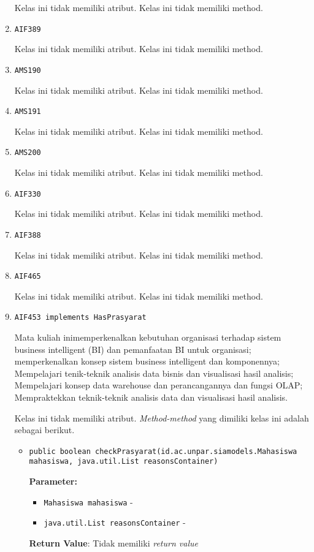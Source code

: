 \documentclass{article}
\begin{document}
\begin{enumerate}
Kelas ini tidak memiliki atribut. Kelas ini tidak memiliki method. \item \texttt{AIF389}



Kelas ini tidak memiliki atribut. Kelas ini tidak memiliki method. \item \texttt{AMS190}



Kelas ini tidak memiliki atribut. Kelas ini tidak memiliki method. \item \texttt{AMS191}



Kelas ini tidak memiliki atribut. Kelas ini tidak memiliki method. \item \texttt{AMS200}



Kelas ini tidak memiliki atribut. Kelas ini tidak memiliki method. \item \texttt{AIF330}



Kelas ini tidak memiliki atribut. Kelas ini tidak memiliki method. \item \texttt{AIF388}



Kelas ini tidak memiliki atribut. Kelas ini tidak memiliki method. \item \texttt{AIF465}



Kelas ini tidak memiliki atribut. Kelas ini tidak memiliki method. \item \texttt{AIF453 implements HasPrasyarat}

Mata kuliah inimemperkenalkan kebutuhan organisasi terhadap sistem business
 intelligent (BI) dan pemanfaatan BI untuk organisasi; memperkenalkan konsep
 sistem business intelligent dan komponennya; Mempelajari tenik-teknik
 analisis data bisnis dan visualisasi hasil analisis; Mempelajari konsep data
 warehouse dan perancangannya dan fungsi OLAP; Mempraktekkan teknik-teknik
 analisis data dan visualisasi hasil analisis.

Kelas ini tidak memiliki atribut. \textit{Method-method} yang dimiliki kelas ini adalah sebagai berikut.
\begin{itemize}
\item \texttt{public boolean checkPrasyarat(id.ac.unpar.siamodels.Mahasiswa mahasiswa, java.util.List reasonsContainer)}

\textbf{Parameter:}
\begin{itemize}
\item \texttt{Mahasiswa mahasiswa} - 
\item \texttt{java.util.List reasonsContainer} - 
\end{itemize}
\textbf{Return Value}: Tidak memiliki \textit{return value}


\end{itemize}
\end{enumerate}
\end{document}
